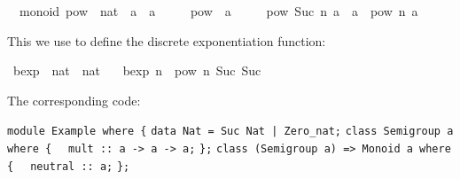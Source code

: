 \begin{isabellebody}
\isamarkuptrue%
%
\isadelimquoteme
%
\endisadelimquoteme
%
\isatagquoteme
{}\isamarkupfalse%
\ {\isacharparenleft}\ monoid{\isacharparenright}\ pow\ {\isacharcolon}{\isacharcolon}\ {\isachardoublequoteopen}nat\ {\isasymRightarrow}\ {\isacharprime}a\ {\isasymRightarrow}\ {\isacharprime}a{\isachardoublequoteclose}\ \isanewline
\ \ \ \ {\isachardoublequoteopen}pow\ {}\ a\ {\isacharequal}\ {\isasymone}{\isachardoublequoteclose}\isanewline
\ \ {\isacharbar}\ {\isachardoublequoteopen}pow\ {\isacharparenleft}Suc\ n{\isacharparenright}\ a\ {\isacharequal}\ a\ {\isasymotimes}\ pow\ n\ a{\isachardoublequoteclose}%
\endisatagquoteme
{\isafoldquoteme}%
%
\isadelimquoteme
%
\endisadelimquoteme
%
\begin{isamarkuptext}%
\noindent This we use to define the discrete exponentiation function:%
\end{isamarkuptext}%
\isamarkuptrue%
%
\isadelimquoteme
%
\endisadelimquoteme
%
\isatagquoteme
{}\isamarkupfalse%
\ bexp\ {\isacharcolon}{\isacharcolon}\ {\isachardoublequoteopen}nat\ {\isasymRightarrow}\ nat{\isachardoublequoteclose}\ \isanewline
\ \ {\isachardoublequoteopen}bexp\ n\ {\isacharequal}\ pow\ n\ {\isacharparenleft}Suc\ {\isacharparenleft}Suc\ {}{\isacharparenright}{\isacharparenright}{\isachardoublequoteclose}%
\endisatagquoteme
{\isafoldquoteme}%
%
\isadelimquoteme
%
\endisadelimquoteme
%
\begin{isamarkuptext}%
\noindent The corresponding code:%
\end{isamarkuptext}%
\isamarkuptrue%
%
\isadelimquoteme
%
\endisadelimquoteme
%
\isatagquoteme
%
\begin{isamarkuptext}%
\isaverbatim%
\noindent%
\verb|module Example where {|\newline%
\newline%
\newline%
\verb|data Nat = Suc Nat |\verb,|,\verb| Zero_nat;|\newline%
\newline%
\verb|class Semigroup a where {|\newline%
\verb|  mult :: a -> a -> a;|\newline%
\verb|};|\newline%
\newline%
\verb|class (Semigroup a) => Monoid a where {|\newline%
\verb|  neutral :: a;|\newline%
\verb|};|\newline%

\end{isamarkuptext}
\end{isabellebody}

